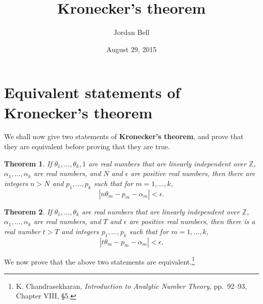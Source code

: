 \documentclass{article}
\newtheorem{theorem}{Theorem}
\theoremstyle{definition}
\begin{document}
\title{Kronecker's theorem}
\author{Jordan Bell}
\date{August 29, 2015}

\maketitle



\section{Equivalent statements of Kronecker's theorem}
We shall now give  two statements of \textbf{Kronecker's theorem}, and prove that they
are equivalent before proving that they are true.

\begin{theorem}
If $\theta_1,\ldots,\theta_k,1$ are real numbers that are linearly
independent over $\mathbb{Z}$,  $\alpha_1,\ldots,\alpha_k$ are real 
numbers, and $N$ and $\epsilon$ are positive real numbers, then there are integers
$n>N$ and $p_1,\ldots,p_k$ such that for $m=1,\ldots,k$,
\[
|n\theta_m - p_m - \alpha_m| < \epsilon.
\]
\label{kronecker1}
\end{theorem}

\begin{theorem}
If $\theta_1,\ldots,\theta_k$ are real numbers that are linearly
independent over $\mathbb{Z}$, $\alpha_1,\ldots,\alpha_k$ are real numbers,
and $T$ and $\epsilon$ are positive real numbers, then there is a  real number $t>T$ 
and integers $p_1,\ldots,p_k$ such that for $m=1,\ldots,k$,
\[
|t\theta_m - p_m - \alpha_m | < \epsilon.
\]
\label{kronecker2}
\end{theorem}

We now prove that the above two statements are equivalent.\footnote{K. Chandrasekharan, {\em Introduction to Analytic Number Theory},
pp.~92--93, Chapter VIII, \S 5.}
\end{document}
